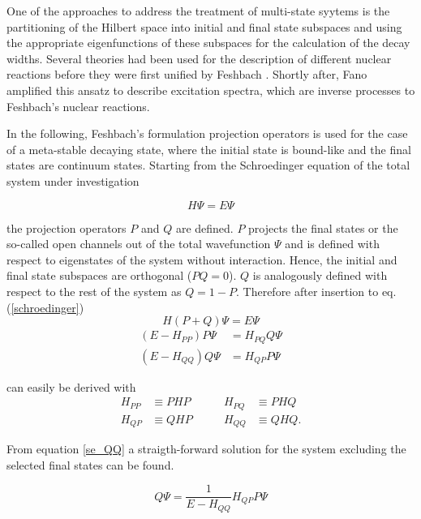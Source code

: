 One of the approaches to address the treatment of multi-state syytems is the
partitioning of the Hilbert space into initial and final
state subspaces and using the appropriate eigenfunctions of these subspaces for the
calculation of the decay widths. 
Several theories had been used for the description of different nuclear reactions
before they were first unified by Feshbach \cite{Feshbach58,Feshbach62,Feshbach_book}.
Shortly after,
Fano amplified this ansatz to describe excitation spectra, which
are inverse processes to Feshbach's nuclear reactions.\cite{Fano61}


In the following, Feshbach's formulation projection
operators is used for the case of a meta-stable decaying state, where the initial state
is bound-like and the final states are continuum states.
Starting from the Schroedinger equation of the total system under investigation

\begin{equation}
  H \Psi = E \Psi \label{schroedinger}
\end{equation}

the projection operators $P$ and $Q$ are defined. $P$ projects the final states
or the so-called open channels out
of the total wavefunction $\Psi$ and is defined with respect to eigenstates
of the system without interaction. Hence, the initial and final state subspaces
are orthogonal ($PQ=0$).
$Q$ is analogously defined with respect to the rest of the
system as $Q = 1 - P$. Therefore after insertion to eq. (\ref{schroedinger})
\begin{equation}
  H (P+Q) \Psi = E \Psi
\end{equation}
\begin{align}
  (E - H_{PP}) P \Psi & = H_{PQ} Q \Psi \label{se_PP}\\
  (E - H_{QQ}) Q \Psi & = H_{QP} P \Psi \label{se_QQ}
\end{align}

can easily be derived with
\begin{align*}
  H_{PP} & \equiv PHP & \quad\quad H_{PQ} & \equiv PHQ\\
  H_{QP} & \equiv QHP & \quad\quad H_{QQ} & \equiv QHQ .
\end{align*}

From equation \ref{se_QQ} a straigth-forward solution for the system excluding
the selected final states can be found.

\begin{equation}
  Q \Psi = \frac{1}{E-H_{QQ}} H_{QP} P \Psi \label{feshbach_qpsi}
\end{equation}

